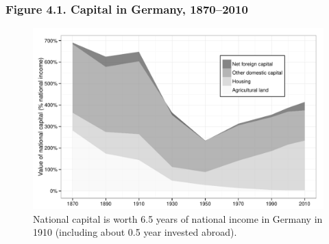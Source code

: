 \documentclass[t]{beamer}\usepackage[]{graphicx}\usepackage[]{color}
\newenvironment{knitrout}{}{} %
\begin{document}
\begin{frame}[label=Figure_4_1]
\frametitle{Figure 4.1. Capital in Germany, 1870--2010}
\begin{figure}[t]
\begin{minipage}[b]{\textwidth}
\centering
\begin{knitrout}\footnotesize
{}\color{fgcolor}

{\centering \includegraphics[width=1\linewidth]{figures/bw/Figure_4_1} 

}



\end{knitrout}
\caption{National capital is worth 6.5 years of national income in Germany in 1910 (including about 0.5 year invested abroad).}
\end{minipage}
\end{figure}
\end{frame}
\end{document}
